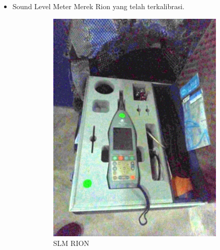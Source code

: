 \documentclass{article}
\begin{document}
\begin{itemize}
		\item Sound Level Meter Merek Rion yang telah terkalibrasi.

		\begin{figure}[H]
			\centering
			\begin{subfigure}[]{.35\textwidth}
				\includegraphics[width=\textwidth]{images/tools_slm_box}
				\caption{SLM RION}
			\end{subfigure}
			\begin{subfigure}[]{.25\textwidth}

\end{subfigure}
\end{figure}
\end{itemize}
\end{document}
